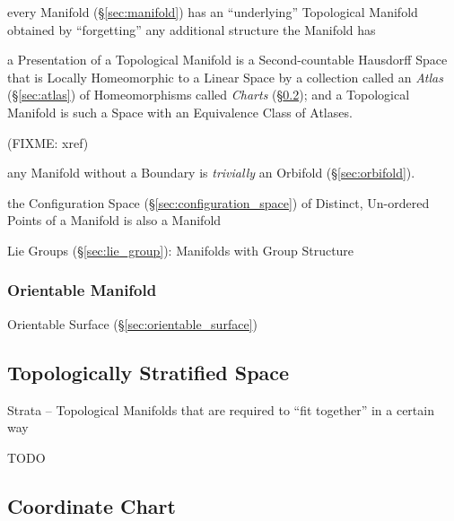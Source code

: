 every Manifold (\S\ref{sec:manifold}) has an ``underlying'' Topological Manifold
obtained by ``forgetting'' any additional structure the Manifold has


a Presentation of a Topological Manifold is a Second-countable Hausdorff Space
that is Locally Homeomorphic to a Linear Space by a collection called an
\emph{Atlas} (\S\ref{sec:atlas}) of Homeomorphisms called \emph{Charts}
(\S\ref{sec:chart}); and a Topological Manifold is such a Space with an
Equivalence Class of Atlases.

(FIXME: xref)

\fist any Manifold without a Boundary is \emph{trivially} an Orbifold
(\S\ref{sec:orbifold}).

the Configuration Space (\S\ref{sec:configuration_space}) of Distinct,
Un-ordered Points of a Manifold is also a Manifold

\fist Lie Groups (\S\ref{sec:lie_group}): Manifolds with Group Structure



\subsubsection{Orientable Manifold}\label{sec:orientable_manifold}

\fist Orientable Surface (\S\ref{sec:orientable_surface})



\subsection{Topologically Stratified Space}\label{sec:topologically_stratified}

Strata -- Topological Manifolds that are required to ``fit together'' in a
certain way

TODO



\subsection{Coordinate Chart}\label{sec:chart}

